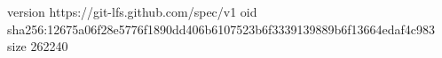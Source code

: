 version https://git-lfs.github.com/spec/v1
oid sha256:12675a06f28e5776f1890dd406b6107523b6f3339139889b6f13664edaf4c983
size 262240
